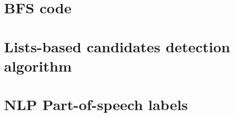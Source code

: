 \section{BFS code}
\label{app:bfs}


\newpage

\section{Lists-based candidates detection algorithm}
\label{app:newTagsList}


\newpage

\section{NLP Part-of-speech labels}
\label{app:pos}
